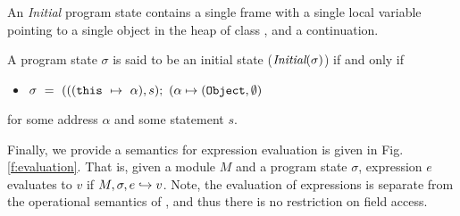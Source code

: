 An \emph{Initial} program state contains a single frame 
with a single local variable  pointing to a single object 
in the heap of class , and a continuation.
\begin{definition}
\label{def:initial}
A program state $\sigma$ is said to be an initial state ($\textit{Initial}(\sigma)$)
if and only if
\begin{itemize}
\item
$\sigma\ =\  ( ((\prg{this}\ \mapsto\ \alpha), s); \  (\alpha \mapsto (\prg{Object}, \emptyset)$
\end{itemize} 
for some address $\alpha$ and some statement $s$.
\end{definition}



Finally, we provide a semantics for expression evaluation is given in Fig. \ref{f:evaluation}. 
That is, given a module $M$ and a program state $\sigma$, expression $e$ evaluates to $v$
if $M, \sigma, e \hookrightarrow v$. Note, the evaluation of expressions is separate from the operational
semantics of \LangOO, and thus there is no restriction on field access.



\newpage
